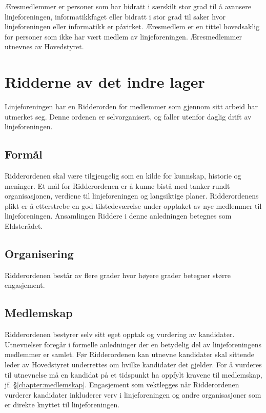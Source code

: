 Æresmedlemmer er personer som har bidratt i særskilt stor grad til å avansere linjeforeningen, informatikkfaget eller bidratt i stor grad til saker hvor linjeforeningen eller informatikk er påvirket.
Æresmedlem er en tittel hovedsaklig for personer som ikke har vært medlem av linjeforeningen.
Æresmedlemmer utnevnes av Hovedstyret.

\section{Ridderne av det indre lager}
\vspace{23pt}

Linjeforeningen har en Ridderorden for medlemmer som gjennom sitt arbeid har utmerket seg. Denne ordenen er selvorganisert, og faller utenfor daglig drift av linjeforeningen.

\subsection{Formål}
Ridderordenen skal være tilgjengelig som en kilde for kunnskap, historie og meninger. Et mål for Ridderordenen er å kunne bistå med tanker rundt organisasjonen, verdiene til linjeforeningen og langsiktige planer.
Ridderordenens plikt er å etterstrebe en god tilstedeværelse under opptaket av nye medlemmer til linjeforeningen. Ansamlingen Riddere i denne anledningen betegnes som Eldsterådet.


\subsection{Organisering}{
Ridderordenen består av flere grader hvor høyere grader betegner større engasjement.
}

\subsection{Medlemskap}{
Ridderordenen bestyrer selv sitt eget opptak og vurdering av kandidater. Utnevnelser foregår i formelle anledninger der en betydelig del av linjeforeningens medlemmer er samlet. Før Ridderordenen kan utnevne kandidater skal sittende leder av Hovedstyret underrettes om hvilke kandidater det gjelder. For å vurderes til utnevnelse må en kandidat på et tidspunkt ha oppfylt kravene til medlemskap, jf. §\ref{chapter:medlemskap}. Engasjement som vektlegges når Ridderordenen vurderer kandidater inkluderer verv i linjeforeningen og andre organisasjoner som er direkte knyttet til linjeforeningen.
}
